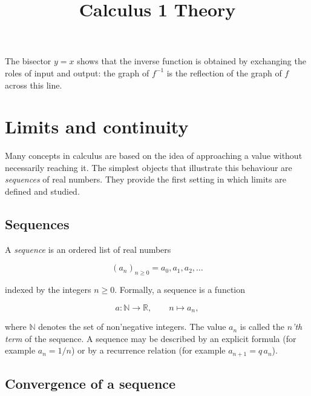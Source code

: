 \documentclass[11pt,a4paper]{article} \usepackage[T1]{fontenc}
\theoremstyle{plain} \newtheorem{theorem}{Theorem} \title{Calculus 1 Theory}
\begin{document}
\begin{center}


\end{center}

The bisector $y=x$ shows that the inverse function is obtained by exchanging
the roles of input and output: the graph of $f^{-1}$ is the reflection of the
graph of $f$ across this line.

\section{Limits and continuity}

Many concepts in calculus are based on the idea of approaching a value without
necessarily reaching it. The simplest objects that illustrate this behaviour
are \emph{sequences} of real numbers. They provide the first setting in which
limits are defined and studied.

\subsection{Sequences}

A \emph{sequence} is an ordered list of real numbers

\[
(a_n)_{n\ge 0} = a_0, a_1, a_2, \ldots
\]

indexed by the integers $n\ge 0$. Formally, a sequence is a function

\[
a : \mathbb{N} \to \mathbb{R}, \qquad n \mapsto a_n,
\]

where $\mathbb{N}$ denotes the set of non’negative integers. The value $a_n$ is
called the \emph{$n$’th term} of the sequence. A sequence may be described by
an explicit formula (for example $a_n = 1/n$) or by a recurrence relation (for
example $a_{n+1} = q\,a_n$).

\subsection{Convergence of a sequence}
\end{document}
